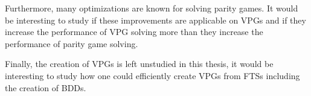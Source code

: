Furthermore, many optimizations are known for solving parity games. It would be interesting to study if these improvements are applicable on VPGs and if they increase the performance of VPG solving more than they increase the performance of parity game solving. 

Finally, the creation of VPGs is left unstudied in this thesis, it would be interesting to study how one could efficiently create VPGs from FTSs including the creation of BDDs.